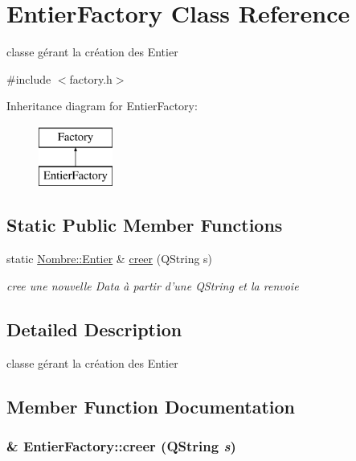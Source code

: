 \hypertarget{classEntierFactory}{
\section{EntierFactory Class Reference}
\label{classEntierFactory}
}


classe gérant la création des Entier  




{\ttfamily \#include $<$factory.h$>$}

Inheritance diagram for EntierFactory:\begin{figure}[H]
\begin{center}
\leavevmode
\includegraphics[height=2cm]{classEntierFactory}
\end{center}
\end{figure}
\subsection*{Static Public Member Functions}
\begin{DoxyCompactItemize}
\item 
static \hyperlink{classNombre_1_1Entier}{Nombre::Entier} \& \hyperlink{classEntierFactory_a17b1d9b2f18be4ad886f23cecd0ecb7c}{creer} (QString s)
\begin{DoxyCompactList}\small\item\em cree une nouvelle Data à partir d'une QString et la renvoie \item\end{DoxyCompactList}\end{DoxyCompactItemize}


\subsection{Detailed Description}
classe gérant la création des Entier 

\subsection{Member Function Documentation}
\hypertarget{classEntierFactory_a17b1d9b2f18be4ad886f23cecd0ecb7c}{
\subsubsection[{creer}]{ \& EntierFactory::creer (QString {\em s})}}
\label{classEntierFactory_a17b1d9b2f18be4ad886f23cecd0ecb7c}


